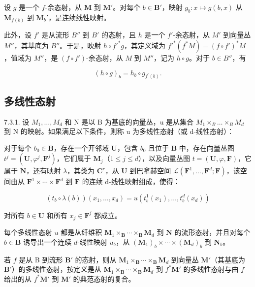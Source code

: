 设 \(g\) 是一个 \(f\)-余态射，从 \(\mathbf{M}\) 到 \(\mathbf{M}'\)。对每个 \(b \in \mathbf{B}'\)，映射 \(g_b: x \mapsto g(b, x)\) 从 \(\mathbf{M}_{f(b)}\) 到 \(\mathbf{M}_b'\)，是连续线性映射。

此外，设 \(f'\) 是从流形 \(B''\) 到 \(B'\) 的态射，且 \(h\) 是一个 \(f'\)-余态射，从 \(M'\) 到向量丛 \(M''\)，其基底为 \(B''\)。于是，映射 \(h \circ f'^{*}g\)，其定义域为 \(f'^{*}(f^{*}M) = (f \circ f')^{*}M\)，值域为 \(M''\)，是 \((f \circ f')\)-余态射，从 \(M\) 到 \(M''\)，记为 \(h \circ g\)。对于 \(b \in B''\)，有

\[
(h \circ g) _ {b} = h _ {b} \circ g _ {f ^ {\prime} (b)}.
\]

\subsection{多线性态射}

7.3.1. 设 \(M_{1},\ldots,M_{d}\) 和 N 是以 B 为基底的向量丛，u 是从集合 \(M_{1}\times_{B}\ldots\times_{B}M_{d}\) 到 N 的映射。如果满足以下条件，则称 u 为多线性态射（或 d-线性态射）：

对于每个 \(b_0 \in \mathbf{B}\)，存在一个开邻域 \(\mathbf{U}\)，包含 \(b_0\) 且位于 \(\mathbf{B}\) 中，存在向量丛图 \(t^j = (\mathbf{U}, \varphi^j, \mathbf{F}^j)\)，它们属于 \(\mathbf{M}_j\)（\(1 \leqslant j \leqslant d\)），以及向量丛图 \(t = (\mathbf{U}, \varphi, \mathbf{F})\)，它属于 \(\mathbf{N}\)，还有映射 \(\lambda\)，其类为 \(\mathbf{C}^r\)，从 \(\mathbf{U}\) 到巴拿赫空间 \(\mathcal{L}(\mathbf{F}^1, \ldots, \mathbf{F}^d; \mathbf{F})\)，该空间由从 \(\mathbf{F}^1 \times \cdots \times \mathbf{F}^d\) 到 \(\mathbf{F}\) 的连续 d-线性映射组成，使得：

\[
(t _ {b} \circ \lambda (b)) (x _ {1}, \dots , x _ {d}) = u (t _ {b} ^ {1} (x _ {1}), \dots , t _ {b} ^ {d} (x _ {d}))
\]

对所有 \(b \in \mathbf{U}\) 和所有 \(x_{j} \in \mathbf{F}^{j}\) 都成立。

每个多线性态射 \(u\) 都是从纤维积 \(\mathbf{M}_{1} \times_{\mathbf{B}} \cdots \times_{\mathbf{B}} \mathbf{M}_{d}\) 到 \(\mathbf{N}\) 的流形态射，并且对每个 \(b \in \mathbf{B}\) 诱导出一个连续 \(d\)-线性映射 \(u_b\)，从 \((\mathbf{M}_{1})_{b} \times \cdots \times (\mathbf{M}_{d})_{b}\) 到 \(\mathbf{N}_{b}\)。

若 \(f\) 是从 B 到流形 \(\mathbf{B}'\) 的态射，则从 \(\mathbf{M}_1 \times_{\mathbf{B}} \cdots \times_{\mathbf{B}} \mathbf{M}_d\) 到向量丛 \(\mathbf{M}'\)（其基底为 \(\mathbf{B}'\)）的多线性态射，按定义是从 \(\mathbf{M}_1 \times_{\mathbf{B}} \cdots \times_{\mathbf{B}} \mathbf{M}_d\) 到 \(f^*\mathbf{M}'\) 的多线性态射与由 \(f\) 给出的从 \(f^*\mathbf{M}'\) 到 \(\mathbf{M}'\) 的典范态射的复合。

